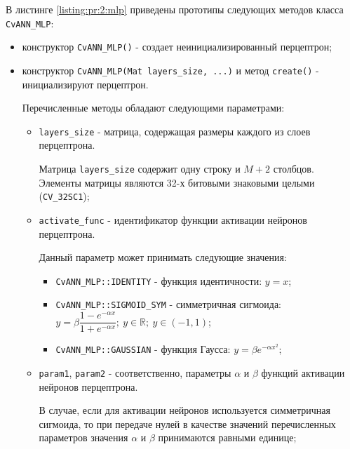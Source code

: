 В листинге \ref{listing:pr:2:mlp} приведены прототипы следующих методов класса \verb|CvANN_MLP|:

\begin{itemize}

	\item конструктор \verb|CvANN_MLP()| - создает неинициализированный перцептрон;
	\item конструктор \verb|CvANN_MLP(Mat layers_size, ...)| и метод \verb|create()| - инициализируют перцептрон.

	Перечисленные методы обладают следующими параметрами:

	\begin{itemize}

		\item \verb|layers_size| - матрица, содержащая размеры каждого из слоев перцептрона.
			
		Матрица \verb|layers_size| содержит одну строку и $M + 2$ столбцов. Элементы матрицы являются 32-х битовыми знаковыми целыми (\verb|CV_32SC1|);

		\item \verb|activate_func| - идентификатор функции активации нейронов перцептрона.

		Данный параметр может принимать следующие значения:

		\begin{itemize}

			\item \verb|CvANN_MLP::IDENTITY| - функция идентичности: $y = x$;
			\item \verb|CvANN_MLP::SIGMOID_SYM| - симметричная сигмоида: $y = \beta \dfrac{1 - e^{-\alpha x}}{1 + e^{-\alpha x}} ;~ y \in \mathbb{R} ;~ y \in (-1, 1)$;
			\item \verb|CvANN_MLP::GAUSSIAN| - функция Гаусса: $y = \beta e^{- \alpha x ^ 2}$; %

		\end{itemize}

		\item \verb|param1|, \verb|param2| - соответственно, параметры $\alpha$ и $\beta$ функций активации нейронов перцептрона.

		В случае, если для активации нейронов используется симметричная сигмоида, то при передаче нулей в качестве значений перечисленных параметров значения $\alpha$ и $\beta$ принимаются равными единице;

	\end{itemize}


\end{itemize}

